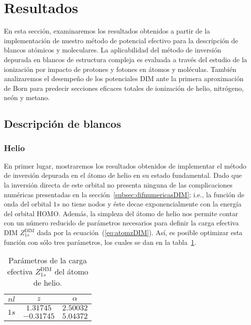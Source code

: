 \section{Resultados}

En esta sección, examinaremos los resultados obtenidos a partir de la 
implementación de nuestro método de potencial efectivo para la descripción 
de blancos atómicos y moleculares. 
La aplicabilidad del método de inversión depurada en blancos de 
estructura compleja es evaluada a través del estudio de la ionización 
por impacto de protones y fotones en átomos y moléculas. También 
analizaremos el desempeño de los potenciales DIM ante la primera 
aproximación de Born para predecir secciones eficaces totales de 
ionización de helio, nitrógeno, neón y metano.

\subsection{Descripción de blancos}
\subsubsection*{Helio}

En primer lugar, mostraremos los resultados obtenidos de implementar
el método de inversión depurada en el átomo de helio en su estado
fundamental. Dado que la inversión directa de este orbital no presenta 
ninguna de las complicaciones numéricas presentadas en la
sección~\ref{subsec:difnumericasDIM}; i.e., la función de onda del 
orbital $1s$ no tiene nodos y éste decae exponencialmente con la energía 
del orbital HOMO. Además, la simpleza del átomo de helio nos permite contar 
con un número reducido de parámetros necesarios para definir la carga 
efectiva DIM $Z_{1s}^{\mathrm{ DIM}}$ dada por la 
ecuación~(\ref{eq:atomzDIM}). Así, es posible optimizar esta función 
con sólo tres parámetros, los cuales se dan en la tabla~\ref{tab:parametrosHe}.

\begin{table}
\begin{center}
\begin{tabular}{|c|c|c|}
\hline
  $nl$ & $z$ & $\alpha$ \\
\hline
\hline
\multirow{2}{*}{$1s$} &  $1.31745$ & $2.50032$ \\
                      & $-0.31745$ & $5.04372$ \\
\hline
\end{tabular}
\caption[Parámetros de la carga efectiva del helio.]
{Parámetros de la carga efectiva $Z_{1s}^{\mathrm{ DIM}}$ del átomo de 
helio.}
\label{tab:parametrosHe}
\end{center}
\end{table}

